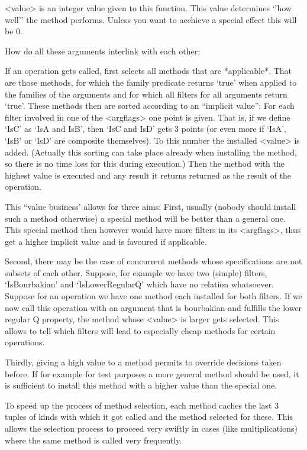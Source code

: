 <value> is an integer value given to this function. This value determines
`'how well'' the method performs. Unless you want to acchieve a special
effect this will be 0.

How do all these arguments interlink with each other:

If an operation gets called, {\GAP} first selects all methods that are
*applicable*. That are those methods, for which the family predicate
returns `true' when applied to the families of the arguments and for which
all filters for all arguments return `true'. These methods then are sorted
according to an ``implicit value'': For each filter involved in one of the
<argflags> one point is given. That is, if we define `IsC' as `IsA and
IsB', then `IsC and IsD' gets 3 points (or even more if `IsA', `IsB' or
`IsD' are composite themselves).
To this number the installed <value> is
added.
(Actually this sorting can take place already when installing the method, so
there is no time loss for this during execution.)
Then the method with the highest value is executed and any result it returns
returned as the result of the operation.

This ``value business' allows for three aims: First, usually (nobody should
install such a method otherwise) a special method will be better than a
general one. This special method then however would have more filters in its 
<argflags>, thus get a higher implicit value and is favoured if applicable.

Second, there may be the case of concurrent methods whose specifications are
not subsets of each other. Suppose, for example we have two (simple) filters,
`IsBourbakian' and `IsLowerRegularQ' which have no relation whatsoever.
Suppose for an operation we have one method each installed for both filters.
If we now call this operation with an argument that is bourbakian and
fulfills the lower regular Q property, the method whose <value> is larger
gets selected. This allows to tell {\GAP} which filters will  lead to
especially cheap methods for certain operations.

Thirdly, giving a high value to a method permits to override decisions taken
before. If for example for test purposes a more general method should be
used, it is sufficient to install this method with a higher value than the
special one.

\danger
To speed up the process of method selection, each method caches the last 3
tuples of kinds with which it got called and the method selected for these.
This allows the selection process to proceed very swiftly in cases (like
multiplications) where the same method is called very frequently.

